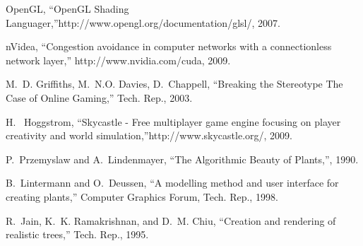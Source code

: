 \documentclass[10pt, conference, compsocconf]{IEEEtran}
\begin{document}
\begin{thebibliography}{21}
OpenGL, ``OpenGL Shading Languager,''http://www.opengl.org/documentation/glsl/, 2007.

nVidea, ``Congestion avoidance in computer
  networks with a connectionless network layer,'' http://www.nvidia.com/cuda, 2009.

M.~D. Griffiths, M.~N.O. Davies, D.~Chappell, ``Breaking the Stereotype The Case of Online Gaming,'' Tech. Rep., 2003.

H. ~Hoggstrom, ``Skycastle - Free multiplayer game engine focusing on player creativity and world simulation,''http://www.skycastle.org/, 2009.

P.~Przemyslaw and A.~Lindenmayer, ``The Algorithmic Beauty of Plants,'', 1990.

B.~Lintermann and O.~Deussen, ``A modelling method and user interface for creating plants,'' Computer Graphics Forum, Tech. Rep., 1998.

R.~Jain, K.~K. Ramakrishnan, and D.~M. Chiu, ``Creation and rendering of realistic trees,'' Tech. Rep., 1995.

\end{thebibliography}

%
%

\end{document}
